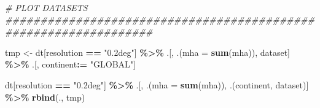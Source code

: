 \documentclass[
  11pt,
]{article}
\newenvironment{Shaded}{\begin{snugshade}}{\end{snugshade}}
\newcommand{\AttributeTok}[1]{\textcolor[rgb]{0.13,0.29,0.53}{#1}}
\newcommand{\CommentTok}[1]{\textcolor[rgb]{0.56,0.35,0.01}{\textit{#1}}}
\newcommand{\FunctionTok}[1]{\textcolor[rgb]{0.13,0.29,0.53}{\textbf{#1}}}
\newcommand{\NormalTok}[1]{#1}
\newcommand{\OtherTok}[1]{\textcolor[rgb]{0.56,0.35,0.01}{#1}}
\newcommand{\SpecialCharTok}[1]{\textcolor[rgb]{0.81,0.36,0.00}{\textbf{#1}}}
\newcommand{\StringTok}[1]{\textcolor[rgb]{0.31,0.60,0.02}{#1}}
\begin{document}
\begin{Shaded}
\begin{Highlighting}[]
\CommentTok{\# PLOT DATASETS \#\#\#\#\#\#\#\#\#\#\#\#\#\#\#\#\#\#\#\#\#\#\#\#\#\#\#\#\#\#\#\#\#\#\#\#\#\#\#\#\#\#\#\#\#\#\#\#\#\#\#\#\#\#\#\#\#\#\#\#\#\#\#\#\#}

\NormalTok{tmp }\OtherTok{\textless{}{-}}\NormalTok{ dt[resolution }\SpecialCharTok{==} \StringTok{"0.2deg"}\NormalTok{] }\SpecialCharTok{\%\textgreater{}\%}
\NormalTok{  .[, .(}\AttributeTok{mha =} \FunctionTok{sum}\NormalTok{(mha)), dataset] }\SpecialCharTok{\%\textgreater{}\%}
\NormalTok{  .[, continent}\SpecialCharTok{:=} \StringTok{"GLOBAL"}\NormalTok{]}

\NormalTok{dt[resolution }\SpecialCharTok{==} \StringTok{"0.2deg"}\NormalTok{] }\SpecialCharTok{\%\textgreater{}\%}
\NormalTok{  .[, .(}\AttributeTok{mha =} \FunctionTok{sum}\NormalTok{(mha)), .(continent, dataset)] }\SpecialCharTok{\%\textgreater{}\%}
  \FunctionTok{rbind}\NormalTok{(., tmp)}
\end{Highlighting}
\end{Shaded}
\end{document}
